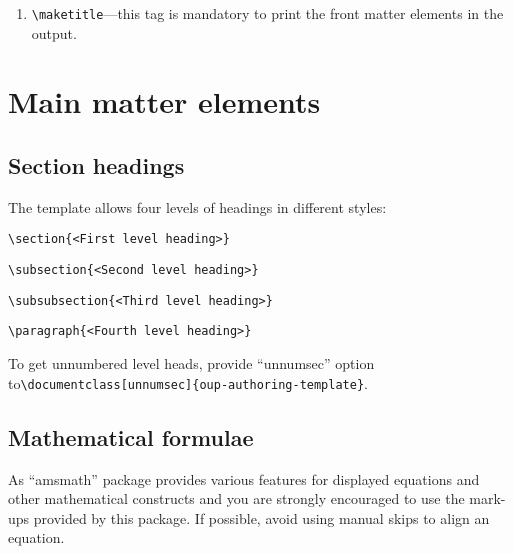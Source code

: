 \documentclass{article}
\begin{document}
\begin{enumerate}
\item \verb+\maketitle+---this tag is mandatory to print the front matter elements in the output.

\end{enumerate}


\section{Main matter elements }
\subsection{Section headings}
The template allows four levels of headings in different styles:

\medskip

\verb+\section{<First level heading>} +

\verb+\subsection{<Second level heading>} +

\verb+\subsubsection{<Third level heading>}+

\verb+\paragraph{<Fourth level heading>} +

\medskip

\noindent To get unnumbered level heads, provide ``unnumsec'' option to\newline \verb+\documentclass[unnumsec]{oup-authoring-template}+.

\subsection{Mathematical formulae}

As ``amsmath'' package provides various features for displayed equations and other mathematical constructs and you are strongly encouraged to use the mark-ups provided by this package. If possible, avoid using manual skips to align an equation.
\end{document}
